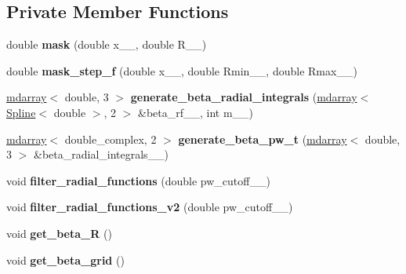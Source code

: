 \subsection*{Private Member Functions}
\begin{DoxyCompactItemize}
\item 
\hypertarget{classsirius_1_1_real__space__prj_a97a87b96a1acd30e398d0203ddfddcda}{}double {\bfseries mask} (double x\+\_\+\+\_\+, double R\+\_\+\+\_\+)\label{classsirius_1_1_real__space__prj_a97a87b96a1acd30e398d0203ddfddcda}

\item 
\hypertarget{classsirius_1_1_real__space__prj_a93150dbb7019aaac33e78795d91cb585}{}double {\bfseries mask\+\_\+step\+\_\+f} (double x\+\_\+\+\_\+, double Rmin\+\_\+\+\_\+, double Rmax\+\_\+\+\_\+)\label{classsirius_1_1_real__space__prj_a93150dbb7019aaac33e78795d91cb585}

\item 
\hypertarget{classsirius_1_1_real__space__prj_a5eff7a5f9ef6918cd9d0ab54b0e5aed5}{}\hyperlink{classsddk_1_1mdarray}{mdarray}$<$ double, 3 $>$ {\bfseries generate\+\_\+beta\+\_\+radial\+\_\+integrals} (\hyperlink{classsddk_1_1mdarray}{mdarray}$<$ \hyperlink{classsirius_1_1_spline}{Spline}$<$ double $>$, 2 $>$ \&beta\+\_\+rf\+\_\+\+\_\+, int m\+\_\+\+\_\+)\label{classsirius_1_1_real__space__prj_a5eff7a5f9ef6918cd9d0ab54b0e5aed5}

\item 
\hypertarget{classsirius_1_1_real__space__prj_a375280a016ad6487a6abe84db3de9c16}{}\hyperlink{classsddk_1_1mdarray}{mdarray}$<$ double\+\_\+complex, 2 $>$ {\bfseries generate\+\_\+beta\+\_\+pw\+\_\+t} (\hyperlink{classsddk_1_1mdarray}{mdarray}$<$ double, 3 $>$ \&beta\+\_\+radial\+\_\+integrals\+\_\+\+\_\+)\label{classsirius_1_1_real__space__prj_a375280a016ad6487a6abe84db3de9c16}

\item 
\hypertarget{classsirius_1_1_real__space__prj_ae808fe5d45c548c4e2073c766eb101f2}{}void {\bfseries filter\+\_\+radial\+\_\+functions} (double pw\+\_\+cutoff\+\_\+\+\_\+)\label{classsirius_1_1_real__space__prj_ae808fe5d45c548c4e2073c766eb101f2}

\item 
\hypertarget{classsirius_1_1_real__space__prj_a2a65892721721764aafdfb356de301c3}{}void {\bfseries filter\+\_\+radial\+\_\+functions\+\_\+v2} (double pw\+\_\+cutoff\+\_\+\+\_\+)\label{classsirius_1_1_real__space__prj_a2a65892721721764aafdfb356de301c3}

\item 
\hypertarget{classsirius_1_1_real__space__prj_a92346df400b150c005e7cfbf3fba7c2a}{}void {\bfseries get\+\_\+beta\+\_\+\+R} ()\label{classsirius_1_1_real__space__prj_a92346df400b150c005e7cfbf3fba7c2a}

\item 
\hypertarget{classsirius_1_1_real__space__prj_a5e00c9c46efeabd01d343c6abc75fc5d}{}void {\bfseries get\+\_\+beta\+\_\+grid} ()\label{classsirius_1_1_real__space__prj_a5e00c9c46efeabd01d343c6abc75fc5d}

\end{DoxyCompactItemize}
